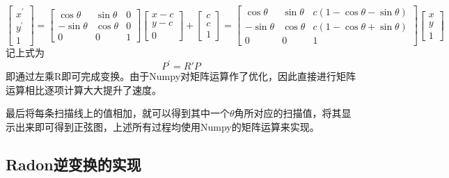 \documentclass[UTF8]{ctexart}
\begin{document}
\begin{equation}
    \left[
        \begin{array}{c}
           x^\prime \\
           y^\prime \\
           1
        \end{array}
        \right]=
    \left[
        \begin{array}{ccc}
            \cos{\theta} & \sin{\theta} & 0\\
            -\sin{\theta} & \cos{\theta} & 0\\
            0 & 0 & 1
         \end{array}
    \right]
    \left[
        \begin{array}{c}
            x-c\\
            y-c\\
            0
        \end{array}
    \right]+\left[
        \begin{array}{c}
            c\\
            c\\
            1
        \end{array}
    \right]=
    \left[
        \begin{array}{ccc}
            \cos{\theta} & \sin{\theta} & c(1-\cos{\theta}- \sin{\theta})\\
            -\sin{\theta} & \cos{\theta} & c(1-\cos{\theta}+\sin{\theta})\\
            0 & 0 & 1
         \end{array}
    \right]
    \left[
        \begin{array}{c}
            x\\
            y\\
            1
        \end{array}
    \right]
\end{equation}
记上式为
\begin{equation}
    P^\prime=R\prime P
\end{equation}
即通过左乘R即可完成变换。由于Numpy对矩阵运算作了优化，因此直接进行矩阵运算相比逐项计算大大提升了速度。

最后将每条扫描线上的值相加，就可以得到其中一个$\theta$角所对应的扫描值，将其显示出来即可得到正弦图，上述所有过程均使用Numpy的矩阵运算来实现。

\subsection{Radon逆变换的实现}
\end{document}
